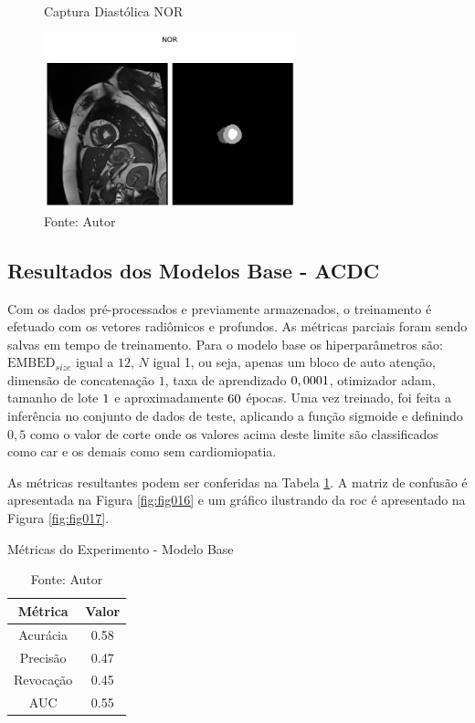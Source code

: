 \begin{figure}[h!]
    \centering
    \captionsetup{width=0.98\textwidth, justification=justified}
    \caption{Captura Diastólica NOR}
    \includegraphics[width=0.65\textwidth]{figures/fig020.png}
    \caption*{Fonte: Autor}
    \label{fig:fig020}
\end{figure}

\subsection{Resultados dos Modelos Base - ACDC}
\label{subsec:resultados_acdc_base}

Com os dados pré-processados e previamente armazenados, o treinamento é efetuado com os vetores radiômicos e profundos. As métricas parciais foram sendo salvas em tempo de treinamento. Para o modelo base os hiperparâmetros são: $\text{EMBED}_{size}$ igual a $12$, $N$ igual 1, ou seja, apenas um bloco de auto atenção, dimensão de concatenação $1$, taxa de aprendizado $0,0001$, otimizador \gls{adam}, tamanho de lote $1$ e aproximadamente $60$ épocas. Uma vez treinado, foi feita a inferência no conjunto de dados de teste, aplicando a função sigmoide e definindo $0,5$ como o valor de corte onde os valores acima deste limite são classificados como \gls{car} e os demais como sem cardiomiopatia. 

As métricas resultantes podem ser conferidas na Tabela \ref{tab:metrics}. A matriz de confusão é apresentada na Figura \ref{fig:fig016} e um gráfico ilustrando da \gls{roc} é apresentado na Figura \ref{fig:fig017}.
\newline

\begin{table}[h!]
    \centering
    \caption{Métricas do Experimento - Modelo Base}
    \renewcommand{\arraystretch}{1} %
    \begin{tabular}{|c|c|}
    \hline 
          \textbf{Métrica} & \textbf{Valor} \\ 
    \hline 
        Acurácia & 0.58 \\ 
    \hline 
        Precisão & 0.47 \\ 
    \hline 
        Revocação & 0.45 \\ 
    \hline 
        AUC & 0.55 \\ 
    \hline 
    \end{tabular} 
    \caption*{Fonte: Autor}
    \label{tab:metrics}
\end{table}

